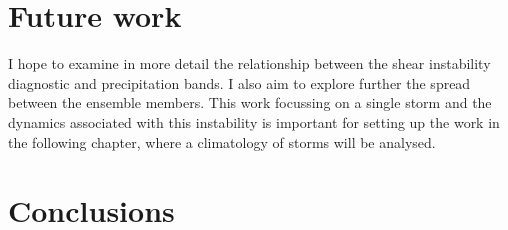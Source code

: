 \section {Future work}  

I hope to examine in more detail the relationship between the shear instability diagnostic and precipitation bands. I also aim to explore further the spread between the ensemble members. This work focussing on a single storm and the dynamics associated with this instability is important for setting up the work in the following chapter, where a climatology of storms will be analysed.



\section{Conclusions}




